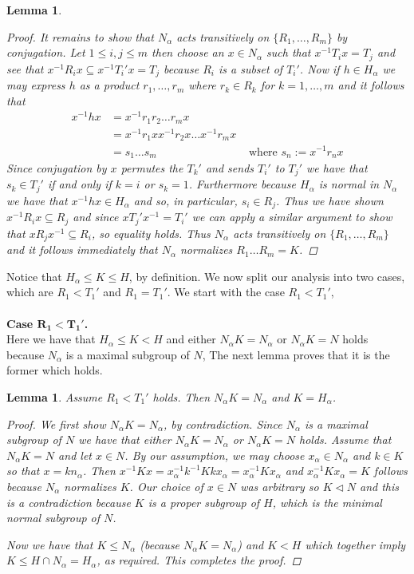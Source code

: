 \documentclass[]{article}
\newtheorem{lem}[thm]{Lemma}
\theoremstyle{definition}
\begin{document}
\begin{lem}
\begin{proof}
		It remains to show that $N_\alpha$ acts transitively on $\{R_1,\dots,R_m \}$ by conjugation. Let $1\leq i,j \leq m$ then choose an $x \in N_\alpha$ such that $x^{-1}T_ix = T_j$ and see that $x^{-1}R_i x \subseteq x^{-1}T_i' x = T_j$ because $R_i$ is a subset of $T_i'$. Now if $h \in H_\alpha$ we may express $h$ as a product $r_1,\dots,r_m$ where $r_k \in R_k$ for $k=1,\dots,m$ and it follows that \begin{align*}
			x^{-1}hx & = x^{-1}r_1 r_2\dots r_mx & \\
			& = x^{-1}r_1 x x^{-1}r_2 x \dots x^{-1}r_m x & \\
			& = s_1\dots s_m & \mbox{ where } s_n:=x^{-1}r_n x
		\end{align*}
		Since conjugation by $x$ permutes the $T_k'$ and sends $T_i'$ to $T_j'$ we have that $s_k \in T_j'$ if and only if $k=i$ or $s_k=1$. Furthermore because $H_\alpha$ is normal in $N_\alpha$ we have that $x^{-1}hx \in H_\alpha$ and so, in particular, $s_i \in R_j$. Thus we have shown $x^{-1}R_i x \subseteq R_j$ and since $xT_j' x^{-1}=T_i'$ we can apply a similar argument to show that $xR_j x^{-1} \subseteq R_i$, so equality holds. Thus $N_\alpha$ acts transitively on $\{R_1,\dots,R_m \}$ and it follows immediately that $N_\alpha$ normalizes $R_1\dots R_m=K$.
	\end{proof}
\end{lem}

Notice that $H_\alpha \leqslant K \leqslant H$, by definition. We now split our analysis into two cases, which are $R_1 < T_1'$ and $R_1 = T_1'$. We start with the case $R_1<T_1'$,
\\
\\ \textbf{Case $\mathbf{R_1<T_1'}$.} 
\\

Here we have that $H_\alpha \leqslant K < H$ and either $N_\alpha K = N_\alpha$ or $N_\alpha K = N$ holds because $N_\alpha$ is a maximal subgroup of $N$, The next lemma proves that it is the former which holds.

\begin{lem}
	Assume $R_1 < T_1'$ holds. Then $N_\alpha K = N_\alpha$ and $K = H_\alpha$.
\begin{proof}
	 We first show $N_\alpha K = N_\alpha$, by contradiction. Since $N_\alpha$ is a maximal subgroup of $N$ we have that either $N_\alpha K = N_\alpha$ or $N_\alpha K = N$ holds. Assume that $N_\alpha K = N$ and let $x \in N$. By our assumption, we may choose $x_\alpha \in N_\alpha$ and $k \in K$ so that $x=kn_\alpha$. Then $x^{-1}Kx = x_\alpha^{-1}k^{-1}Kkx_\alpha=x_\alpha^{-1}Kx_\alpha$ and $x_\alpha^{-1}Kx_\alpha = K$ follows because $N_\alpha$ normalizes $K$. Our choice of $x \in N$ was arbitrary so $K \lhd N$ and this is a contradiction because $K$ is a proper subgroup of $H$, which is the minimal normal subgroup of $N$. 
	 
	 Now we have that $K \leqslant N_\alpha$ (because $N_\alpha K = N_\alpha$) and $K < H$ which together imply $K \leqslant H \cap N_\alpha = H_\alpha$, as required. This completes the proof. 
\end{proof}
\end{lem}
\end{document}
